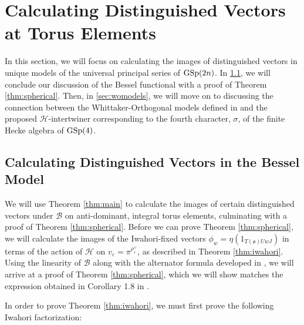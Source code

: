 \documentclass[11pt,letterpaper]{article}
\newcommand{\calH}{\mathcal{H}} %
\newcommand{\calB}{\mathcal{B}}
\newcommand{\calF}{\mathcal{F}}
\newcommand{\ve}{\varepsilon}
\newcommand{\goth}{\mathfrak}
\newcommand{\GSp}{\textup{GSp}}
\newcommand{\ind}{\textup{ind}}
\newtheorem{Proposition}[Theorem]{Proposition}
\theoremstyle{remark}
\numberwithin{equation}{section}
\begin{document}
\section{Calculating Distinguished Vectors at Torus Elements} \label{sec:spherical}

In this section, we will focus on calculating the images of distinguished vectors in unique models of the universal principal series of $\GSp(2n)$. In \ref{sec:besspherical}, we will conclude our discussion of the Bessel functional with a proof of Theorem \ref{thm:spherical}. Then, in \ref{sec:womodels}, we will move on to discussing the connection between the Whittaker-Orthogonal models defined in \cite{BFG} and the proposed $\calH$-intertwiner corresponding to the fourth character, $\sigma$, of the finite Hecke algebra of $\GSp(4)$.

\subsection{Calculating Distinguished Vectors in the Bessel Model} \label{sec:besspherical}

We will use Theorem \ref{thm:main} to calculate the images of certain distinguished vectors under $\calB$ on anti-dominant, integral torus elements, culminating with a proof of Theorem \ref{thm:spherical}. Before we can prove Theorem \ref{thm:spherical}, we will calculate the images of the Iwahori-fixed vectors $\phi_w = \eta(1_{T(\goth{o})UwJ})$ in terms of the action of $\calH$ on $v_{\ve} = \pi^{\rho_{\ve}^{\vee}}$, as described in Theorem \ref{thm:iwahori}. Using the linearity of $\calB$ along with the alternator formula developed in \cite{BBF2}, we will arrive at a proof of Theorem \ref{thm:spherical}, which we will show matches the expression obtained in Corollary 1.8 in \cite{BFF}. 

\begin{comment}
\begin{Proposition}\label{prop:jfixed}
For dominant $\lambda$ and fixed $w$, $$\calB(\pi^{-\lambda}\cdot \phi_w) = \frac{1}{m(J\pi^{\lambda}J)}T_w\pi^{\lambda}\cdot v_{\ve},$$ where the action of $T$ on $\ind_B^G\chi_{\textup{univ}}^{-1}$ is by right translation and where the action of $T_w\pi^{\lambda}$ on $v_{\ve}$ is the left action on $v_{\ve}$ appearing in the definition of $\calF$.
\end{Proposition}
\end{comment}

In order to prove Theorem \ref{thm:iwahori}, we must first prove the following Iwahori factorization:
\end{document}
